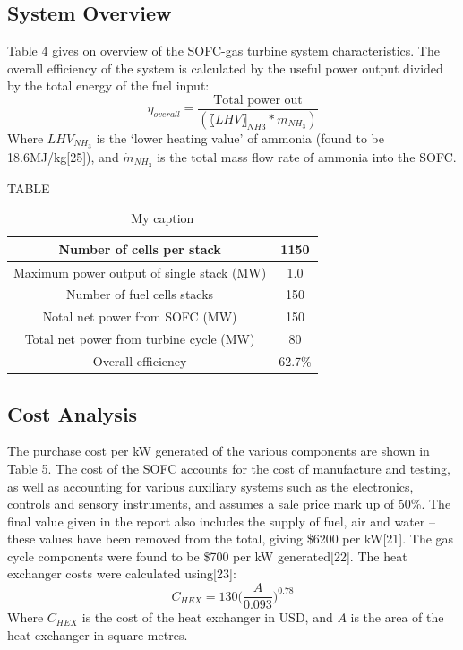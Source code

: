\subsection{System Overview}
Table 4 gives on overview of the SOFC-gas turbine system characteristics. The overall efficiency of the system is calculated by the useful power output divided by the total energy of the fuel input:
\begin{equation}
\eta_{overall}=  \frac{\text{Total power out}}{(〖LHV〗_{NH3}* \dot{m}_{NH_3})}				
\end{equation}
Where $LHV_{NH_3}$ is the ‘lower heating value’ of ammonia (found to be 18.6MJ/kg[25]), and $\dot{m}_{NH_3}$ is the total mass flow rate of ammonia into the SOFC.

TABLE
\begin{table}[h!]
\centering
\caption{My caption}
\label{my-label}
\begin{tabular}{|c|c|}
\hline
Number of cells per stack                 & 1150   \\ \hline
Maximum power output of single stack (MW) & 1.0    \\ \hline
Number of fuel cells stacks               & 150    \\ \hline
Notal net power from SOFC (MW)            & 150    \\ \hline
Total net power from turbine cycle (MW)   & 80     \\ \hline
Overall efficiency                        & 62.7\% \\ \hline
\end{tabular}
\end{table}

\subsection{Cost Analysis} 
The purchase cost per kW generated of the various components are shown in Table 5. The cost of the SOFC accounts for the cost of manufacture and testing, as well as accounting for various auxiliary systems such as the electronics, controls and sensory instruments, and assumes a sale price mark up of 50\%. The final value given in the report also includes the supply of fuel, air and water – these values have been removed from the total, giving \$6200 per kW[21]. The gas cycle components were found to be \$700 per kW generated[22]. The heat exchanger costs were calculated using[23]:
\begin{equation}
C_{HEX}=130\Big ( \frac{A}{0.093}\Big )	^{0.78} 					
\end{equation}
Where $C_{HEX}$ is the cost of the heat exchanger in USD, and $A$ is the area of the heat exchanger in square metres.

